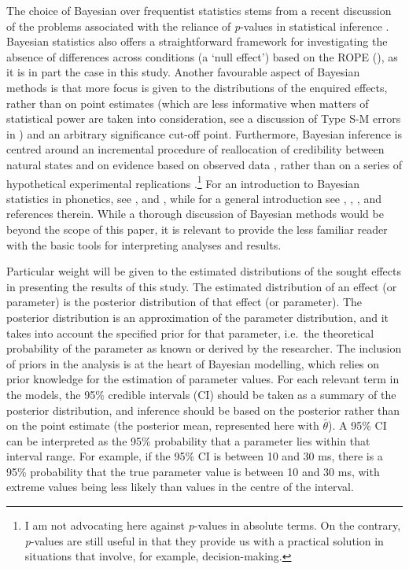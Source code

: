 \documentclass[12pt,a4paper,]{article}
\begin{document}
The choice of Bayesian over frequentist statistics stems from a recent
discussion of the problems associated with the reliance of
\emph{p}-values in statistical inference
\citep{wagenmakers2007, munafo2017, kirby2018, roettger2019}. Bayesian
statistics also offers a straightforward framework for investigating the
absence of differences across conditions (a `null effect') based on the
ROPE (), as it is in part the case in this study.
Another favourable aspect of Bayesian methods is that more focus is
given to the distributions of the enquired effects, rather than on point
estimates (which are less informative when matters of statistical power
are taken into consideration, see a discussion of Type S-M errors in
\citealt{kirby2018}) and an arbitrary significance cut-off point.
Furthermore, Bayesian inference is centred around an incremental
procedure of reallocation of credibility between natural states and on
evidence based on observed data \citep{kruschke2015}, rather than on a
series of hypothetical experimental replications
\citep{wagenmakers2007}.\footnote{I am not advocating here against \textit{p}-values in absolute terms. On the contrary, \textit{p}-values are still useful in that they provide us with a practical solution in situations that involve, for example, decision-making.}
For an introduction to Bayesian statistics in phonetics, see
\citet{vasishth2018}, and \citet{nicenboim2018a}, while for a general
introduction see \citet{etz2018}, \citet{mcelreath2015},
\citet{kruschke2015}, and references therein. While a thorough
discussion of Bayesian methods would be beyond the scope of this paper,
it is relevant to provide the less familiar reader with the basic tools
for interpreting analyses and results.

Particular weight will be given to the estimated distributions of the
sought effects in presenting the results of this study. The estimated
distribution of an effect (or parameter) is the posterior distribution
of that effect (or parameter). The posterior distribution is an
approximation of the parameter distribution, and it takes into account
the specified prior for that parameter, i.e.~the theoretical probability
of the parameter as known or derived by the researcher. The inclusion of
priors in the analysis is at the heart of Bayesian modelling, which
relies on prior knowledge for the estimation of parameter values. For
each relevant term in the models, the 95\% credible intervals (CI)
should be taken as a summary of the posterior distribution, and
inference should be based on the posterior rather than on the point
estimate (the posterior mean, represented here with \(\bar{\theta}\)). A
95\% CI can be interpreted as the 95\% probability that a parameter lies
within that interval range. For example, if the 95\% CI is between 10
and 30 ms, there is a 95\% probability that the true parameter value is
between 10 and 30 ms, with extreme values being less likely than values
in the centre of the interval.
\end{document}
